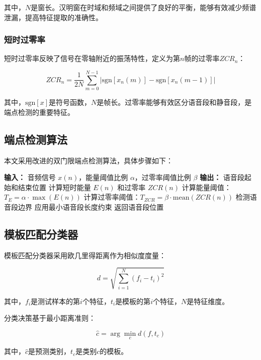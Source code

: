 \documentclass[sigconf,nonacm]{acmart}
\begin{document}
其中，$N$是窗长。汉明窗在时域和频域之间提供了良好的平衡，能够有效减少频谱泄漏，提高特征提取的准确性。

\subsubsection{短时过零率}

短时过零率反映了信号在零轴附近的振荡特性，定义为第$n$帧的过零率$ZCR_n$：

\begin{equation}
ZCR_n = \frac{1}{2N} \sum_{m=0}^{N-1} |\text{sgn}[x_n(m)] - \text{sgn}[x_n(m-1)]|
\end{equation}

其中，$\text{sgn}[x]$是符号函数，$N$是帧长。过零率能够有效区分语音段和静音段，是端点检测的重要特征。

\subsection{端点检测算法}

本文采用改进的双门限端点检测算法，具体步骤如下：

\begin{algorithmic}
\STATE \textbf{输入：} 音频信号 $x(n)$，能量阈值比例 $\alpha$，过零率阈值比例 $\beta$
\STATE \textbf{输出：} 语音段起始和结束位置
\STATE 计算短时能量 $E(n)$ 和过零率 $ZCR(n)$
\STATE 计算能量阈值：$T_E = \alpha \cdot \max(E(n))$
\STATE 计算过零率阈值：$T_{ZCR} = \beta \cdot \text{mean}(ZCR(n))$
\STATE 检测语音段边界
\STATE 应用最小语音段长度约束
\STATE 返回语音段位置
\end{algorithmic}

\subsection{模板匹配分类器}

模板匹配分类器采用欧几里得距离作为相似度度量：

\begin{equation}
d = \sqrt{\sum_{i=1}^{N} (f_i - t_i)^2}
\end{equation}

其中，$f_i$是测试样本的第$i$个特征，$t_i$是模板的第$i$个特征，$N$是特征维度。

分类决策基于最小距离准则：

\begin{equation}
\hat{c} = \arg\min_{c} d(f, t_c)
\end{equation}

其中，$\hat{c}$是预测类别，$t_c$是类别$c$的模板。
\end{document}
